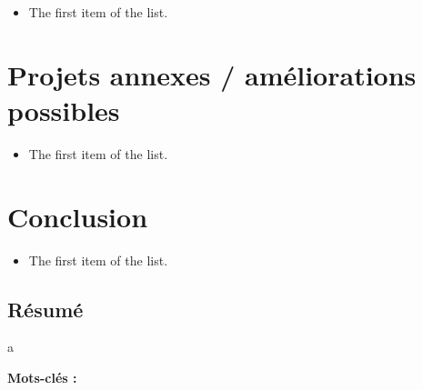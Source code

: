\documentclass{rapport_stage}
\begin{document}
\begin{itemize}[label=$\bullet$]
  \item The first item of the list.
\end{itemize}

\chapter{Projets annexes / améliorations possibles}

\begin{itemize}[label=$\bullet$]
  \item The first item of the list.
\end{itemize}



\chapter*{Conclusion}  %

\begin{itemize}[label=$\bullet$]
  \item The first item of the list.
\end{itemize}%


\cleardoublepage



\printbibliography[
  heading=bibintoc,
  title=Bibliographie / Webographie
]

\cleardoublepage


\listoffigures
\cleardoublepage

\listoftables
\cleardoublepage

\newpage
\printglossaries

\cleardoublepage
\renewcommand{\thesubsection}{\Roman{subsection}}



\cleardoublepage
\thispagestyle{empty}

\section*{Résumé}
{}
a


  {\bf Mots-clés :}
\end{document}
